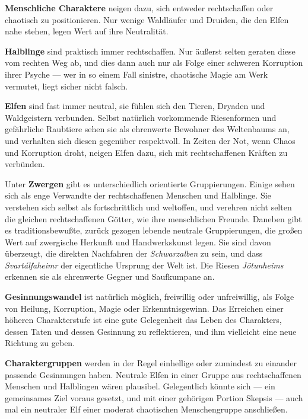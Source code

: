 \documentclass[11pt]{wbzine}
\begin{document}
\begin{multicols}{2}
   \textbf{Menschliche Charaktere} neigen dazu, sich entweder
    rechtschaffen oder chaotisch zu positionieren. Nur wenige
    Waldläufer und Druiden, die den Elfen nahe stehen, legen Wert
    auf ihre Neutralität.

   \textbf{Halblinge} sind praktisch immer rechtschaffen. Nur äußerst
    selten geraten diese vom rechten Weg ab, und dies dann auch nur
    als Folge einer schweren Korruption ihrer Psyche --- wer in so
    einem Fall sinistre, chaotische Magie am Werk vermutet, liegt
    sicher nicht falsch.

   \textbf{Elfen} sind fast immer neutral, sie fühlen sich den Tieren,
    Dryaden und Waldgeistern verbunden. Selbst natürlich vorkommende
    Riesenformen und gefährliche Raubtiere sehen sie als ehrenwerte
    Bewohner des Weltenbaums an, und verhalten sich diesen gegenüber
    respektvoll. In Zeiten der Not, wenn Chaos und Korruption droht,
    neigen Elfen dazu, sich mit rechtschaffenen Kräften zu
    verbünden.

    Unter \textbf{Zwergen} gibt es unterschiedlich orientierte
    Gruppierungen. Einige sehen sich als enge Verwandte der
    rechtschaffenen Menschen und Halblinge. Sie verstehen sich
    selbst als fortschrittlich und weltoffen, und verehren nicht
    selten die gleichen rechtschaffenen Götter, wie ihre
    menschlichen Freunde. Daneben gibt es traditionsbewußte, zurück
    gezogen lebende neutrale Gruppierungen, die großen Wert auf
    zwergische Herkunft und Handwerkskunst legen. Sie sind davon
    überzeugt, die direkten Nachfahren der \textit{Schwarzalben} zu
    sein, und dass \textit{Svartálfaheimr} der eigentliche Ursprung
    der Welt ist. Die Riesen \textit{Jötunheims} erkennen sie als
    ehrenwerte Gegner und Saufkumpane an. 

    \textbf{Gesinnungswandel} ist natürlich möglich, freiwillig oder
    unfreiwillig, als Folge von Heilung, Korruption, Magie oder
    Erkenntnisgewinn. Das Erreichen einer höheren Charakterstufe ist
    eine gute Gelegenheit das Leben des Charakters, dessen Taten und
    dessen Gesinnung zu reflektieren, und ihm vielleicht eine neue
    Richtung zu geben.

   \textbf{Charaktergruppen} werden in der Regel einhellige oder
    zumindest zu einander passende Gesinnungen haben. Neutrale Elfen
    in einer Gruppe aus rechtschaffenen Menschen und Halblingen
    wären plausibel. Gelegentlich könnte sich --- ein gemeinsames
    Ziel voraus gesetzt, und mit einer gehörigen Portion Skepsis ---
    auch mal ein neutraler Elf einer moderat chaotischen
    Menschengruppe anschließen.


\end{multicols}
\end{document}
